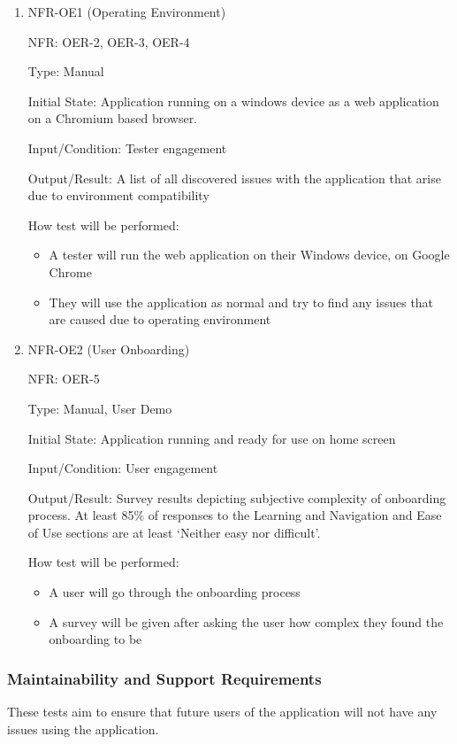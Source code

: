 \documentclass[12pt, titlepage]{article}
\begin{document}
\begin{enumerate}

\item{NFR-OE1 (Operating Environment)\\}

NFR: OER-2, OER-3, OER-4

Type: Manual

Initial State: Application running on a windows device as a web application on a
Chromium based browser.

Input/Condition: Tester engagement

Output/Result: A list of all discovered issues with the application that arise
due to environment compatibility

How test will be performed: 
\begin{itemize}
  \item A tester will run the web application on their Windows device, on Google
  Chrome
  \item They will use the application as normal and try to find any issues that
  are caused due to operating environment
\end{itemize}
					
\item{NFR-OE2 (User Onboarding)\\}

NFR: OER-5

Type: Manual, User Demo

Initial State: Application running and ready for use on home screen

Input/Condition: User engagement

Output/Result: Survey results depicting subjective complexity of onboarding
process. At least 85\% of responses to the Learning and Navigation and Ease of
Use sections are at least `Neither easy nor difficult'.

How test will be performed: 
\begin{itemize}
  \item A user will go through the onboarding process
  \item A survey will be given after asking the user how complex they found the
  onboarding to be
\end{itemize}
\end{enumerate}

\subsubsection{Maintainability and Support Requirements}
These tests aim to ensure that future users of the application will not have any
issues using the application. 
\end{document}
